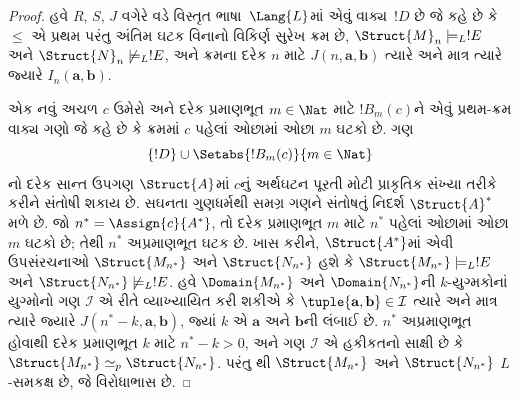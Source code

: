 \begin{proof}
હવે $R$, $S$, $J$ વગેરે વડે વિસ્તૃત ભાષા~$\Lang{L}$માં એવું
વાક્ય~$!D$ છે જે કહે છે કે $\le$ એ પ્રથમ પરંતુ અંતિમ ઘટક વિનાનો
વિકિર્ણ સુરેખ ક્રમ છે, $\Struct{M}_n \models_L !E$ અને
$\Struct{N}_n \not\models_L !E$, અને ક્રમના દરેક $n$ માટે
$J(n, \mathbf{a}, \mathbf{b})$ ત્યારે અને માત્ર ત્યારે જ્યારે
$I_n(\mathbf{a}, \mathbf{b})$.

એક નવું અચળ $c$ ઉમેરો અને દરેક પ્રમાણભૂત $m\in\Nat$ માટે
$!B_m(c)$ને એવું પ્રથમ-ક્રમ વાક્ય ગણો જે કહે છે કે ક્રમમાં
$c$ પહેલાં ઓછામાં ઓછા $m$ ઘટકો છે. ગણ
\[
  \{!D\} \cup \Setabs{!B_m(c)}{m\in\Nat}
\]
નો દરેક સાન્ત ઉપગણ $\Struct{A}$માં $c$નું અર્થઘટન પૂરતી મોટી પ્રાકૃતિક
સંખ્યા તરીકે કરીને સંતોષી શકાય છે. સઘનતા ગુણધર્મથી સમગ્ર ગણને સંતોષતું
નિદર્શ $\Struct{A}^*$ મળે છે. જો $n^*=\Assign{c}{A^*}$, તો દરેક
પ્રમાણભૂત $m$ માટે $n^*$ પહેલાં ઓછામાં ઓછા $m$ ઘટકો છે; તેથી $n^*$
અપ્રમાણભૂત ઘટક છે.
ખાસ કરીને, $\Struct{A^*}$માં એવી ઉપસંરચનાઓ
$\Struct{M_{n^*}}$ અને $\Struct{N_{n^*}}$ હશે કે
$\Struct{M_{n^*}} \models_L !E$ અને $\Struct{N_{n^*}}
\not\models_L !E$. હવે $\Domain{M_{n^*}}$ અને
$\Domain{N_{n^*}}$ની $k$-યુગ્મકોનાં યુગ્મોનો ગણ $\mathcal{I}$ એ રીતે
વ્યાખ્યાયિત કરી શકીએ કે
$\tuple{\mathbf{a}, \mathbf{b}} \in \mathcal{I}$ ત્યારે અને માત્ર
ત્યારે જ્યારે $J(n^*-k, \mathbf{a}, \mathbf{b})$, જ્યાં $k$ એ
$\mathbf{a}$ અને $\mathbf{b}$ની લંબાઈ છે. $n^*$ અપ્રમાણભૂત હોવાથી
દરેક પ્રમાણભૂત $k$ માટે $n^* - k >0$, અને ગણ $\mathcal{I}$ એ હકીકતનો
સાક્ષી છે કે $\Struct{M_{n^*}} \simeq_p \Struct{N_{n^*}}$. પરંતુ
થી $\Struct{M_{n^*}}$ અને
$\Struct{N_{n^*}}$ $L$-સમકક્ષ છે, જે વિરોધાભાસ છે.
\end{proof}
\endgroup


\OLEndChapterHook
\endgroup


\OLEndPartHook
